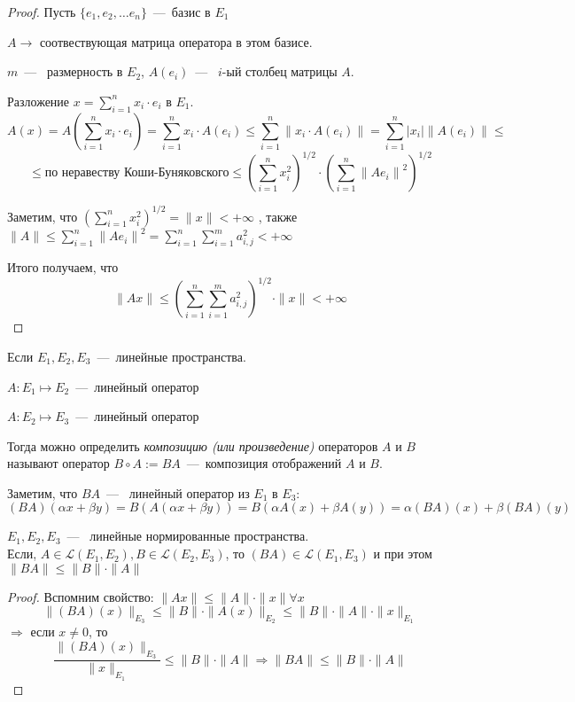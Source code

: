 \begin{proof}
    Пусть $\{ e_1, e_2, \dots e_n \}$~---~базис в $E_1$

    $A \rightarrow$ соотвествующая матрица оператора в этом базисе.

    $m$~---~ размерность в $E_2$, $A(e_i)$~---~ $i$-ый столбец матрицы $A$.
    
    Разложение $x = \sum_{i = 1}^n x_i \cdot e_i$ в $E_1$.
     \[A(x) = A( \sum_{i = 1}^n x_i \cdot e_i ) = \sum_{i = 1}^n x_i \cdot A(e_i) \leq \sum_{i = 1}^n \| x_i \cdot A(e_i) \| = \sum_{i = 1}^n |x_i| \|A(e_i)\| \leq \] \[ \leq \text{по неравеству Коши-Буняковского} \leq \left (\sum_{i = 1}^n {x_i^2} \right)^{1/2} \cdot \left(\sum_{i = 1}^n {\|A e_i\|}^2 \right)^{1/2} \]

     Заметим, что $\left(\sum_{i = 1}^n {x_i^2} \right)^{1/2} = \| x \| < + \infty$ , также $\|A\| \leq \sum_{i = 1}^n {\|A e_i\|}^2 =\sum_{i = 1}^n \sum_{i = 1}^m a_{i, j}^2 < + \infty $

     Итого получаем, что 
     \[ \|Ax\| \leq \left(\sum_{i = 1}^n \sum_{i = 1}^m a_{i, j}^2\right)^{1/2} \cdot \|x\| < +\infty \]
\end{proof}

\begin{definition}
    Если $E_1, E_2, E_3$~---~линейные пространства. 

    $A: E_1 \mapsto E_2$~---~линейный оператор
    
    $A: E_2 \mapsto E_3$~---~линейный оператор

    Тогда можно определить \textit{композицию (или произведение)} операторов $A \text{ и } B$ называют оператор $B \circ A := BA$~---~композиция отображений $A \text{ и } B$.

    Заметим, что $BA$~---~ линейный оператор из $E_1$ в $E_3$:
    \[(BA)(\alpha x + \beta y) = B( A(\alpha x + \beta y) ) = B( \alpha A(x) + \beta A(y)) = \alpha (BA)(x) + \beta (BA)(y)\]
\end{definition}

\begin{lemma}
    $E_1, E_2, E_3$~---~ линейные нормированные пространства. \\ Если, $A \in \mathcal{L}(E_1, E_2), B \in \mathcal{L}(E_2, E_3)$, то $(BA) \in \mathcal{L}(E_1, E_3)$ и при этом $\|BA\| \leq \|B\| \cdot \|A\|$
\end{lemma}

\begin{proof}
    Вспомним свойство: $\| Ax \| \leq \|A\| \cdot \| x \| \forall x$
    \[\|(BA)(x)\|_{E_3} \leq \|B\| \cdot \|A(x)\|_{E_2} \leq \|B\| \cdot \|A\| \cdot \|x\|_{E_1}\]
    $\Rightarrow$ если $x \neq 0$, то 
    \[\frac{\|(BA)(x)\|_{E_3}}{\|x\|_{E_1}} \leq \|B\| \cdot \|A\| \Rightarrow \|BA\| \leq \|B\| \cdot \|A\|\]
\end{proof}

